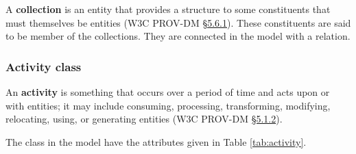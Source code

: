 


A \textbf{collection} is an entity that provides a structure to some constituents that must themselves be entities (W3C PROV-DM \href{https://www.w3.org/TR/prov-dm/#term-collection}{\S5.6.1}). These constituents are said to be member of the collections. They are connected in the model with a  relation.




\subsubsection{Activity class}
\label{sec:activity}

An \textbf{activity} is something that occurs over a period of time and acts upon or with entities; it may include consuming, processing, transforming, modifying, relocating, using, or generating entities (W3C PROV-DM \href{https://www.w3.org/TR/prov-dm/#term-Activity}{\S5.1.2}). 

The  class in the model have the attributes given in Table \ref{tab:activity}. 



